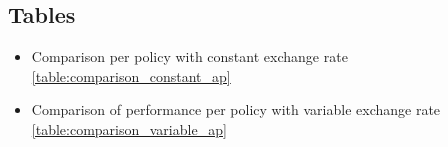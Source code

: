 \begin{large}
\section*{Tables}	

\begin{itemize}
	\item Comparison per policy with constant exchange rate
	\ref{table:comparison_constant_ap}
	\item Comparison of performance per policy with variable exchange rate \ref{table:comparison_variable_ap}
\end{itemize}


\end{large}
